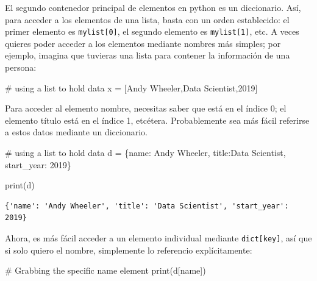 \documentclass[
  letterpaper,
]{scrbook}
\newenvironment{Shaded}{\begin{snugshade}}{\end{snugshade}}
\newcommand{\BuiltInTok}[1]{\textcolor[rgb]{0.00,0.23,0.31}{#1}}
\newcommand{\CommentTok}[1]{\textcolor[rgb]{0.37,0.37,0.37}{#1}}
\newcommand{\DecValTok}[1]{\textcolor[rgb]{0.68,0.00,0.00}{#1}}
\newcommand{\NormalTok}[1]{\textcolor[rgb]{0.00,0.23,0.31}{#1}}
\newcommand{\OperatorTok}[1]{\textcolor[rgb]{0.37,0.37,0.37}{#1}}
\newcommand{\StringTok}[1]{\textcolor[rgb]{0.13,0.47,0.30}{#1}}
\begin{document}
El segundo contenedor principal de elementos en python es un
diccionario. Así, para acceder a los elementos de una lista, basta con
un orden establecido: el primer elemento es \texttt{mylist{[}0{]}}, el
segundo elemento es \texttt{mylist{[}1{]}}, etc. A veces quieres poder
acceder a los elementos mediante nombres más simples; por ejemplo,
imagina que tuvieras una lista para contener la información de una
persona:

\begin{Shaded}
\begin{Highlighting}[]
\CommentTok{\# using a list to hold data}
\NormalTok{x }\OperatorTok{=}\NormalTok{ [}\StringTok{\textquotesingle{}Andy Wheeler\textquotesingle{}}\NormalTok{,}\StringTok{\textquotesingle{}Data Scientist\textquotesingle{}}\NormalTok{,}\StringTok{\textquotesingle{}2019\textquotesingle{}}\NormalTok{]}
\end{Highlighting}
\end{Shaded}

Para acceder al elemento nombre, necesitas saber que está en el índice
0; el elemento título está en el índice 1, etcétera. Probablemente sea
más fácil referirse a estos datos mediante un diccionario.

\begin{Shaded}
\begin{Highlighting}[]
\CommentTok{\# using a list to hold data}
\NormalTok{d }\OperatorTok{=}\NormalTok{ \{}\StringTok{\textquotesingle{}name\textquotesingle{}}\NormalTok{: }\StringTok{\textquotesingle{}Andy Wheeler\textquotesingle{}}\NormalTok{,}
     \StringTok{\textquotesingle{}title\textquotesingle{}}\NormalTok{:}\StringTok{\textquotesingle{}Data Scientist\textquotesingle{}}\NormalTok{,}
     \StringTok{\textquotesingle{}start\_year\textquotesingle{}}\NormalTok{: }\DecValTok{2019}\NormalTok{\}}

\BuiltInTok{print}\NormalTok{(d)}
\end{Highlighting}
\end{Shaded}

\begin{verbatim}
{'name': 'Andy Wheeler', 'title': 'Data Scientist', 'start_year':
2019}
\end{verbatim}

Ahora, es más fácil acceder a un elemento individual mediante
\texttt{dict{[}key{]}}, así que si solo quiero el nombre, simplemente lo
referencio explícitamente:

\begin{Shaded}
\begin{Highlighting}[]
\CommentTok{\# Grabbing the specific name element}
\BuiltInTok{print}\NormalTok{(d[}\StringTok{\textquotesingle{}name\textquotesingle{}}\NormalTok{])}
\end{Highlighting}
\end{Shaded}
\end{document}
